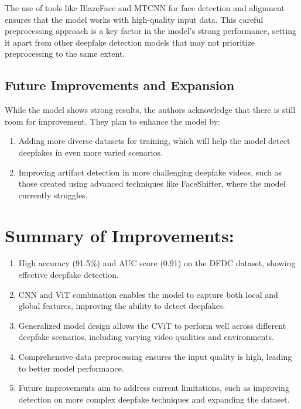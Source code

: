 \documentclass{report}
\begin{document}
	
	The use of tools like BlazeFace and MTCNN for face detection and alignment ensures that the model works with high-quality input data. This careful preprocessing approach is a key factor in the model’s strong performance, setting it apart from other deepfake detection models that may not prioritize preprocessing to the same extent.
	
	
	
	
	\subsection{Future Improvements and Expansion}
	While the model shows strong results, the authors acknowledge that there is still room for improvement. They plan to enhance the model by:
	
	\begin{enumerate}
		\item 
		Adding more diverse datasets for training, which will help the model detect deepfakes in even more varied scenarios.
		
		\item 
		Improving artifact detection in more challenging deepfake videos, such as those created using advanced techniques like FaceShifter, where the model currently struggles.
	\end{enumerate}
	
	
	
	\section{Summary of Improvements:}
	\begin{enumerate}
		\item 
		High accuracy (91.5\%) and AUC score (0.91) on the DFDC dataset, showing effective deepfake detection.
		
		\item 
		CNN and ViT combination enables the model to capture both local and global features, improving the ability to detect deepfakes.
		
		\item 
		Generalized model design allows the CViT to perform well across different deepfake scenarios, including varying video qualities and environments.
		
		\item 
		Comprehensive data preprocessing ensures the input quality is high, leading to better model performance.
		
		\item 
		Future improvements aim to address current limitations, such as improving detection on more complex deepfake techniques and expanding the dataset.
	\end{enumerate}
	
\end{document}
